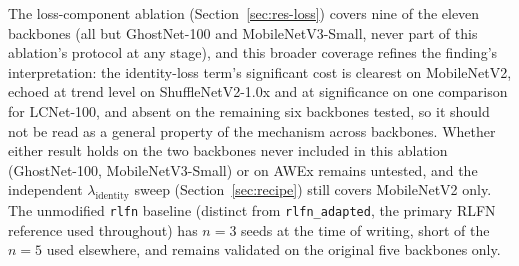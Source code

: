 \documentclass[11pt]{article}
\begin{document}
The loss-component ablation (Section~\ref{sec:res-loss}) covers nine of the eleven backbones (all but GhostNet-100 and MobileNetV3-Small, never part of this ablation's protocol at any stage), and this broader coverage refines the finding's interpretation: the identity-loss term's significant cost is clearest on MobileNetV2, echoed at trend level on ShuffleNetV2-1.0x and at significance on one comparison for LCNet-100, and absent on the remaining six backbones tested, so it should not be read as a general property of the mechanism across backbones. Whether either result holds on the two backbones never included in this ablation (GhostNet-100, MobileNetV3-Small) or on AWEx remains untested, and the independent $\lambda_{\text{identity}}$ sweep (Section~\ref{sec:recipe}) still covers MobileNetV2 only. The unmodified \texttt{rlfn} baseline (distinct from \texttt{rlfn\_adapted}, the primary RLFN reference used throughout) has $n=3$ seeds at the time of writing, short of the $n=5$ used elsewhere, and remains validated on the original five backbones only.
\end{document}
